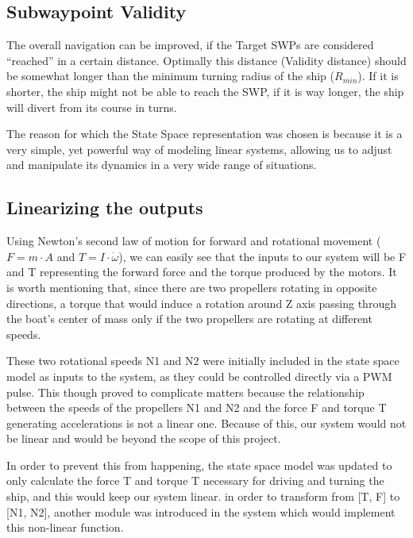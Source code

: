 \subsection{Subwaypoint Validity}

The overall navigation can be improved, if the Target SWPs are considered ``reached'' in a certain distance. Optimally this distance (Validity distance) should be somewhat longer than the minimum turning radius of the ship ($R_{min}$). If it is shorter, the ship might not be able to reach the SWP, if it is way longer, the ship will divert from its course in turns.




The reason for which the State Space representation was chosen is because it is a very simple, yet powerful way of modeling linear systems, allowing us to adjust and manipulate its dynamics in a very wide range of situations. 


\subsection{Linearizing the outputs}

Using Newton's second law of motion for forward  and rotational movement ($F = m \cdot A$ and $T = I \cdot \dot{\omega}$), we can easily see that the inputs to our system will be F and T representing the forward force and the torque produced by the motors. It is worth mentioning that, since there are two propellers rotating in opposite directions, a torque that would induce a rotation around Z axis passing through the boat's center of mass only if the two propellers are rotating at different speeds.

These two rotational speeds N1 and N2 were initially included in the state space model as inputs to the system, as they could be controlled directly via a PWM pulse. This though proved to complicate matters because the relationship between the speeds of the propellers N1 and N2 and the force F and torque T generating accelerations is not a linear one. Because of this, our system would not be linear and would be beyond the scope of this project. 


In order to prevent this from happening, the state space model was updated to only calculate the force T and torque T necessary for driving and turning the ship, and this would keep our system linear. in order to transform from [T, F] to [N1, N2], another module was introduced in the system which would implement this non-linear function. 

